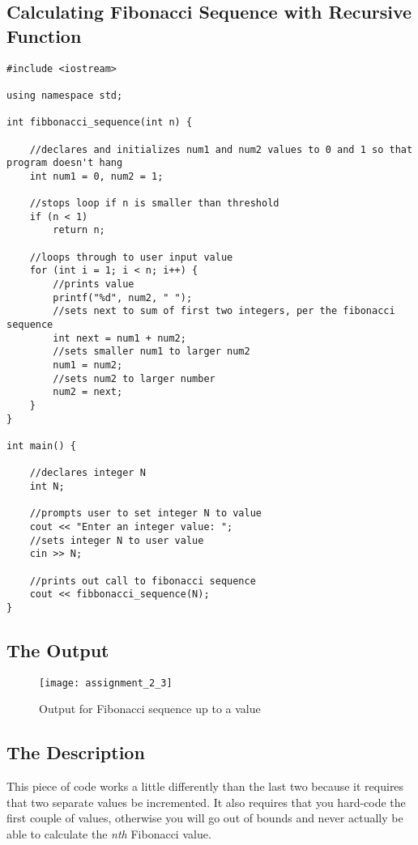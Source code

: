 \documentclass[11pt]{article}
\begin{document}
\subsection*{Calculating Fibonacci Sequence with Recursive Function}
\begin{lstlisting}
#include <iostream>

using namespace std;

int fibbonacci_sequence(int n) {

    //declares and initializes num1 and num2 values to 0 and 1 so that program doesn't hang
    int num1 = 0, num2 = 1;

    //stops loop if n is smaller than threshold
    if (n < 1)
        return n;

    //loops through to user input value
    for (int i = 1; i < n; i++) {
        //prints value
        printf("%d", num2, " ");
        //sets next to sum of first two integers, per the fibonacci sequence
        int next = num1 + num2;
        //sets smaller num1 to larger num2
        num1 = num2;
        //sets num2 to larger number
        num2 = next;
    }
}

int main() {

    //declares integer N
    int N;

    //prompts user to set integer N to value
    cout << "Enter an integer value: ";
    //sets integer N to user value
    cin >> N;

    //prints out call to fibonacci sequence
    cout << fibbonacci_sequence(N);
}
\end{lstlisting}

\subsection*{The Output}
\begin{figure}[H]
    \centering
    \texttt{[image: assignment\_2\_3]}
    \caption{Output for Fibonacci sequence up to a value}
    \label{fig:part 3}
\end{figure}

\subsection*{The Description}
This piece of code works a little differently than the last two because it requires that two separate values be incremented. It also requires that you hard-code the first couple of values, otherwise you will go out of bounds and never actually be able to calculate the \textit{nth} Fibonacci value.
\end{document}
